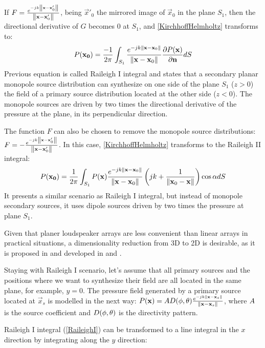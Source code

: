 If $F = \frac{e^{-jk\left\| \mathbf{x} - \mathbf{x}'_0 \right\|}}{\left\| \mathbf{x} - \mathbf{x}'_0 \right\|}$, being $\vec{x}'_0$ the mirrored image of $\vec{x}_0$ in the plane $S_1$, then the directional derivative of $G$ becomes $0$ at $S_1$, and \autoref{KirchhoffHelmholtz} transforms to:
\begin{equation}
P(\mathbf{x_0}) = \frac{-1}{2\pi} \int_{S_1} \frac{e^{-jk\left\| \mathbf{x} - \mathbf{x}_0 \right\|}}{\left\| \mathbf{x} - \mathbf{x}_0 \right\|} \frac{\partial P(\mathbf{x})}{\partial \mathbf{n}} dS
\label{RaileighI}
\end{equation}
Previous equation is called Raileigh I integral and states that a secondary planar monopole source distribution can synthesize on one side of the plane $S_1$ ($z>0$) the field of a primary source distribution located at the other side ($z<0$). The monopole sources are driven by two times the directional derivative of the pressure at the plane, in its perpendicular direction.

The function $F$ can also be chosen to remove the monopole source distributions: $F = -\frac{e^{-jk\left\| \mathbf{x} - \mathbf{x}'_0 \right\|}}{\left\| \mathbf{x} - \mathbf{x}'_0 \right\|}$. In this case, \autoref{KirchhoffHelmholtz} transforms to the Raileigh II integral:
\begin{equation}
P(\mathbf{x_0}) = \frac{1}{2\pi} \int_{S_1} P(\mathbf{x}) \frac{e^{-jk\left\| \mathbf{x} - \mathbf{x}_0 \right\|}}{\left\| \mathbf{x} - \mathbf{x}_0 \right\|}\left(jk + \frac{1}{\left\| \mathbf{x}_0 - \mathbf{x} \right\|}\right)\cos\alpha dS
\end{equation}
It presents a similar scenario as Raileigh I integral, but instead of monopole secondary sources, it uses dipole sources driven by two times the pressure at plane $S_1$.

Given that planer loudspeaker arrays are less convenient than linear arrays in practical situations, a dimensionality reduction from 3D to 2D is desirable, as it is proposed in \cite{Vogel} and developed in \cite{stuart1996application} and \cite{Verheijen}.

Staying with Raileigh I scenario, let's assume that all primary sources and the positions where we want to synthesize their field are all located in the same plane, for example, $y = 0$. The pressure field generated by a primary source located at $\vec{x}_s$ is modelled in the next way: $P(\vec{x}) = \coef \Diag(\phi, \theta) \GreenFunc[\vec{x} - \vec{x}_s]$, where $\coef$ is the source coefficient and $\Diag(\phi, \theta)$ is the directivity pattern.

Raileigh I integral (\autoref{RaileighI}) can be transformed to a line integral in the $x$ direction by integrating along the $y$ direction:

